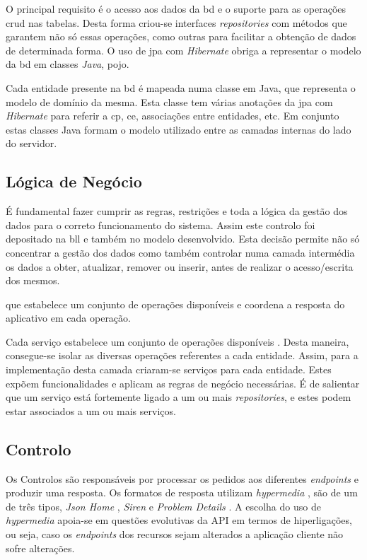 O principal requisito é o acesso aos dados da \acrshort{bd} e o suporte para as operações \acrshort{crud} nas tabelas. Desta forma criou-se interfaces \textit{repositories} com métodos que garantem não só essas operações, como outras para facilitar a obtenção de dados de determinada forma. O uso de \acrshort{jpa} com \textit{Hibernate} obriga a representar o modelo da \acrshort{bd} em classes \textit{Java}, \acrfull{pojo}.

Cada entidade presente na \acrshort{bd} é mapeada numa classe em Java, que representa o modelo de domínio da mesma. Esta classe tem várias anotações da \acrshort{jpa} com \textit{Hibernate} para referir a \acrlong{cp}, \acrlong{ce}, associações entre entidades, etc. Em conjunto estas classes Java formam o modelo utilizado entre as camadas internas do lado do servidor.

%
%
\subsection{Lógica de Negócio}\label{subsec332}

É fundamental fazer cumprir as regras, restrições e toda a lógica da gestão dos dados para o correto funcionamento do sistema. Assim  este controlo foi depositado na \acrfull{bll} e também no modelo desenvolvido. Esta decisão permite não só concentrar a gestão dos dados como também controlar numa camada intermédia os dados a obter, atualizar, remover ou inserir, antes de realizar o acesso/escrita dos mesmos. 

que estabelece um conjunto de operações disponíveis e coordena a resposta do aplicativo em cada operação.

Cada serviço estabelece um conjunto de operações disponíveis \cite{PofEAASe2:serviceLayer}. Desta maneira, consegue-se isolar as diversas operações referentes a cada entidade. Assim, para a implementação desta camada criaram-se serviços para cada entidade. Estes expõem funcionalidades e aplicam as regras de negócio necessárias. É de salientar que um serviço está fortemente ligado a um ou mais \textit{repositories}, e estes podem estar associados a um ou mais serviços.

%
%
\subsection{Controlo}\label{subsec333}

Os Controlos são responsáveis por processar os pedidos aos diferentes \textit{endpoints} e produzir uma resposta. Os formatos de resposta utilizam \textit{hypermedia} \cite{APIBestP87:hypermedia}, são de um de três tipos, \textit{Json Home} \cite{draftnot72:jsonHome}, \textit{Siren} \cite{kevinswiber:siren} e \textit{Problem Details} \cite{RFC7807:problemDetails}. A escolha do uso de \textit{hypermedia} apoia-se em questões evolutivas da API em termos de hiperligações, ou seja, caso os \textit{endpoints} dos recursos sejam alterados a aplicação cliente não sofre alterações.

